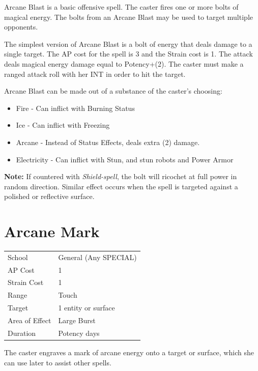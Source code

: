 \documentclass[11pt,a4paper,twocolumn]{book}
\begin{document}
Arcane Blast is a basic offensive spell. The caster fires one or more bolts of magical energy. The bolts from an Arcane Blast may be used to target multiple opponents.

The simplest version of Arcane Blast is a bolt of energy that deals damage to a single target. The AP cost for the spell is 3 and the Strain cost is 1. The attack deals magical energy damage equal to Potency+(2). The caster must make a ranged attack roll with her INT in order to hit the target.

Arcane Blast can be made out of a substance of the caster's choosing:

\begin{itemize}
\item Fire - Can inflict with Burning Status
\item Ice - Can inflict with Freezing
\item Arcane - Instead of Status Effects, deals extra (2) damage.
\item Electricity - Can inflict with Stun, and stun robots and Power Armor
\end{itemize}

\textbf{Note:} If countered with \textit{Shield-spell}, the bolt will ricochet at full power in random direction. Similar effect occurs when the spell is targeted against a polished or reflective surface.


\section*{Arcane Mark}
{
	\begin{tabu} to 75mm{| X[l,4] | X[l,7] |}
		\hline
		School 			& General (Any SPECIAL) \\
        AP Cost	      	& 1 					\\
        Strain Cost     & 1 					\\
        Range     		& Touch 				\\
        Target      	& 1 entity or surface 	\\
        Area of Effect  & Large Burst 	 		\\
        Duration     	& Potency days 			\\ \hline
	\end{tabu}
		
}

\medskip

The caster engraves a mark of arcane energy onto a target or surface, which she can use later to assist other spells.
 
\end{document}
